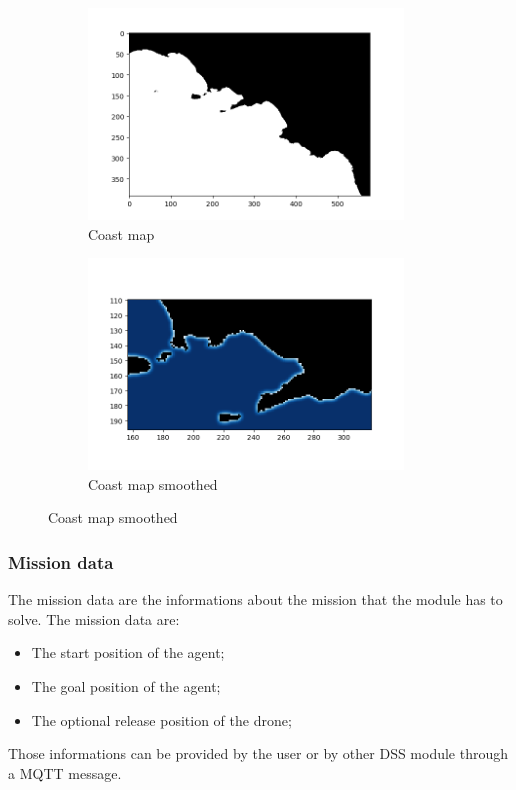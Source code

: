 \documentclass[journal,article,submit,pdftex,moreauthors]{Definitions/mdpi}
\begin{document}
\begin{figure}[h]
	\begin{subfigure}{0.5\textwidth}
		\centering
		\includegraphics[width=\textwidth]{res/imgs/coast.png}
		\caption{Coast map}
		\label{fig:coast}
	\end{subfigure}
	\begin{subfigure}{0.5\textwidth}
		\centering
		\includegraphics[width=\textwidth]{res/imgs/coastBlur.png}
		\caption{Coast map smoothed}
		\label{fig:coastBlur}
	\end{subfigure}
\end{figure}



\subsubsection{Mission data}
The mission data are the informations about the mission that the module has to solve. The mission data are:
\begin{itemize}
	\item The start position of the agent;
	\item The goal position of the agent;
	\item The optional release position of the drone;
\end{itemize}
Those informations can be provided by the user or by other DSS module through a MQTT message.\\
\end{document}

